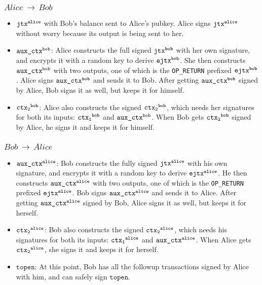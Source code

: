 \subsubsection{$Alice\,\to\,Bob$}
\begin{itemize}[leftmargin=4\parindent]
    \item $\texttt{jtx\textsuperscript{alice}}$ with Bob's balance sent to Alice's pubkey. Alice signs $\texttt{jtx\textsuperscript{alice}}$ without worry because its output is being sent to her.
    \item $\texttt{aux\_ctx\textsuperscript{bob}}$: Alice constructs the full signed $\texttt{jtx\textsuperscript{bob}}$ with her own signature, and encrypts it with a random key to derive $\texttt{ejtx\textsuperscript{bob}}$. She then constructs $\texttt{aux\_ctx\textsuperscript{bob}}$ with two outputs, one of which is the \texttt{OP\_RETURN} prefixed $\texttt{ejtx\textsuperscript{bob}}$. Alice signs $\texttt{aux\_ctx\textsuperscript{bob}}$ and sends it to Bob. After getting $\texttt{aux\_ctx\textsuperscript{bob}}$ signed by Alice, Bob signs it as well, but keeps it for himself.
    \item $\texttt{ctx\textsubscript{2}\textsuperscript{bob}}$: Alice also constructs the signed $\texttt{ctx\textsubscript{2}\textsuperscript{bob}}$, which needs her signatures for both its inputs: $\texttt{ctx\textsubscript{1}\textsuperscript{bob}}$ and $\texttt{aux\_ctx\textsuperscript{bob}}$. When Bob gets $\texttt{ctx\textsubscript{2}\textsuperscript{bob}}$ signed by Alice, he signs it and keeps it for himself.
\end{itemize}
\subsubsection{$Bob\,\to\,Alice$}
\begin{itemize}[leftmargin=4\parindent]
    \item $\texttt{aux\_ctx\textsuperscript{alice}}$: Bob constructs the fully signed $\texttt{jtx\textsuperscript{alice}}$ with his own signature, and encrypts it with a random key to derive $\texttt{ejtx\textsuperscript{alice}}$. He then constructs $\texttt{aux\_ctx\textsuperscript{alice}}$ with two outputs, one of which is the \texttt{OP\_RETURN} prefixed $\texttt{ejtx\textsuperscript{alice}}$. Bob signs $\texttt{aux\_ctx\textsuperscript{alice}}$ and sends it to Alice. After getting $\texttt{aux\_ctx\textsuperscript{alice}}$ signed by Bob, Alice signs it as well, but keeps it for herself.
    \item $\texttt{ctx\textsubscript{2}\textsuperscript{alice}}$: Bob also constructs the signed $\texttt{ctx\textsubscript{2}\textsuperscript{alice}}$, which needs his signatures for both its inputs: $\texttt{ctx\textsubscript{1}\textsuperscript{alice}}$ and $\texttt{aux\_ctx\textsuperscript{alice}}$. When Alice gets $\texttt{ctx\textsubscript{2}\textsuperscript{alice}}$, she signs it and keeps it for herself.     
    \item $\texttt{topen}$: At this point, Bob has all the followup transactions signed by Alice with him, and can safely sign $\texttt{topen}$.
\end{itemize}

